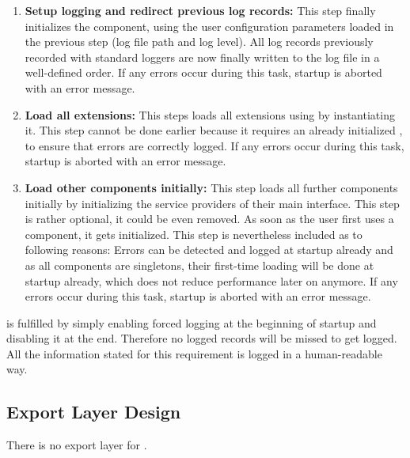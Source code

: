 \begin{enumerate}
	\item \textbf{Setup logging and redirect previous log records:} This step finally initializes the \COMPlogging{} component, using the user configuration parameters loaded in the previous step (log file path and log level). All log records previously recorded with standard loggers are now finally written to the log file in a well-defined order. If any errors occur during this task, \LibName{} startup is aborted with an error message.
	\item \textbf{Load all extensions:} This steps loads all \LibName{} extensions using \COMPextensionManagement{} by instantiating it. This step cannot be done earlier because it requires an already initialized \COMPlogging{}, to ensure that errors are correctly logged. If any errors occur during this task, \LibName{} startup is aborted with an error message.
	\item \textbf{Load other components initially:} This step loads all further \LibName{} components initially by initializing the service providers of their main interface. This step is rather optional, it could be even removed. As soon as the user first uses a component, it gets initialized. This step is nevertheless included as to following reasons: Errors can be detected and logged at startup already and as all components are singletons, their first-time loading will be done at startup already, which does not reduce performance later on anymore. If any errors occur during this task, \LibName{} startup is aborted with an error message.
\end{enumerate}

\REQUcontextVerboseLogging{} is fulfilled by simply enabling forced logging at the beginning of startup and disabling it at the end. Therefore no logged records will be missed to get logged. All the information stated for this requirement is logged in a human-readable way.


\subsection{Export Layer Design}
\label{sec:ExportDesignCOMPcontext}

There is no export layer for \COMPcontext{}.


